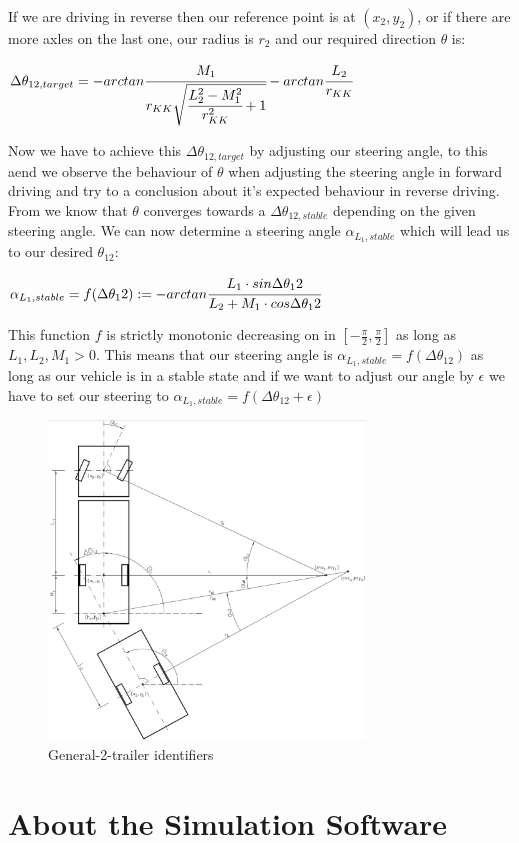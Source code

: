 If we are driving in reverse then our reference point is at $(x_2,y_2)$, or if there are more axles on the last one, our radius is $r_2$ and our required direction $\theta$ is:

\begin{center}
$\Delta \theta_{12,target}=-arctan \cfrac{M_1}{r_{KK} \sqrt{\cfrac{L_2^2-M^2_1}{r^2_{KK}}+1}}-arctan \cfrac{L_2}{r_{KK}}$
\end{center}

Now we have to achieve this $\Delta \theta_{12,target}$ by adjusting our steering angle, to this aend we observe the behaviour of $\theta$ when adjusting the steering angle in forward driving and try to a conclusion about it's expected behaviour in reverse driving. From \cite{12} we know that $\theta$ converges towards a $\Delta \theta_{12,stable}$ depending on the given steering angle. We can now determine a steering angle $\alpha_{L_1,stable}$ which will lead us to our desired $\theta_12$:

\begin{center}
$\alpha_{L_1,stable}=f(\Delta \theta_12):=-arctan \cfrac{L_1 \cdot sin \Delta \theta_12}{L_2+M_1 \cdot cos \Delta \theta_12}$
\end{center}

This function $f$ is strictly monotonic decreasing on in $\left[- \tfrac{\pi}{2},\tfrac{\pi}{2} \right]$ as long as $L_1, L_2, M_1 >0$. This means that our steering angle is $\alpha_{L_1,stable}=f(\Delta \theta_12)$ as long as our vehicle is in a stable state and if we want to adjust our angle by $\epsilon$ we have to set our steering to $\alpha_{L_1,stable}=f(\Delta \theta_12+\epsilon)$


\begin{figure}[h]
\centering
\includegraphics[width=0.75\textwidth]{./Chapters/Figures/vehicle_kinematic.png}
\caption{General-2-trailer identifiers\label{pic:vehicle_kinematic}}
\end{figure}


\section{About the Simulation Software}
\label{sec:previous_knowledge_ezsystems}

